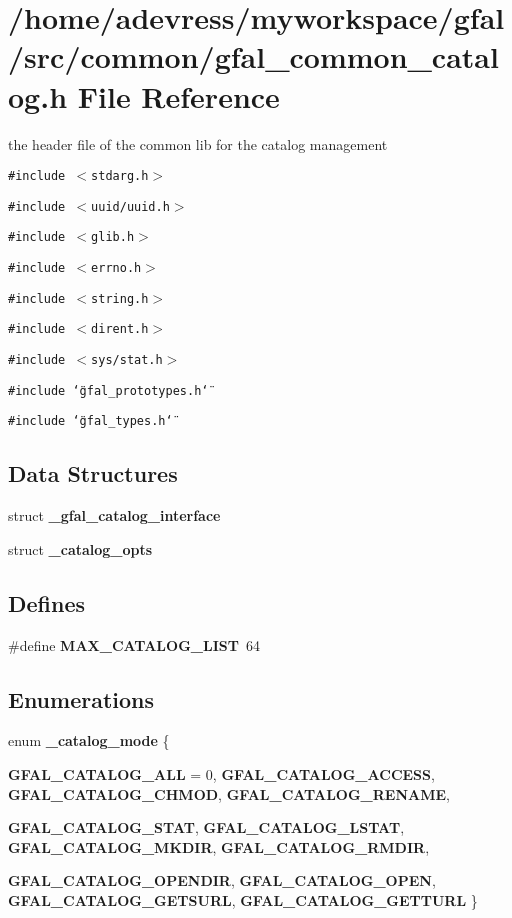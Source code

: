 \section{/home/adevress/myworkspace/gfal/src/common/gfal\_\-common\_\-catalog.h File Reference}
\label{gfal__common__catalog_8h}
the header file of the common lib for the catalog management 

{\tt \#include $<$stdarg.h$>$}\par
{\tt \#include $<$uuid/uuid.h$>$}\par
{\tt \#include $<$glib.h$>$}\par
{\tt \#include $<$errno.h$>$}\par
{\tt \#include $<$string.h$>$}\par
{\tt \#include $<$dirent.h$>$}\par
{\tt \#include $<$sys/stat.h$>$}\par
{\tt \#include \char`\"{}gfal\_\-prototypes.h\char`\"{}}\par
{\tt \#include \char`\"{}gfal\_\-types.h\char`\"{}}\par
\subsection*{Data Structures}
\begin{CompactItemize}
\item 
struct \textbf{\_\-gfal\_\-catalog\_\-interface}
\item 
struct \bf{\_\-catalog\_\-opts}
\end{CompactItemize}
\subsection*{Defines}
\begin{CompactItemize}
\item 
\#define \textbf{MAX\_\-CATALOG\_\-LIST}~64\label{gfal__common__catalog_8h_c39f705683e893b91f559704ee2a707e}

\end{CompactItemize}
\subsection*{Enumerations}
\begin{CompactItemize}
\item 
enum \textbf{\_\-catalog\_\-mode} \{ \par
\textbf{GFAL\_\-CATALOG\_\-ALL} = 0, 
\textbf{GFAL\_\-CATALOG\_\-ACCESS}, 
\textbf{GFAL\_\-CATALOG\_\-CHMOD}, 
\textbf{GFAL\_\-CATALOG\_\-RENAME}, 
\par
\textbf{GFAL\_\-CATALOG\_\-STAT}, 
\textbf{GFAL\_\-CATALOG\_\-LSTAT}, 
\textbf{GFAL\_\-CATALOG\_\-MKDIR}, 
\textbf{GFAL\_\-CATALOG\_\-RMDIR}, 
\par
\textbf{GFAL\_\-CATALOG\_\-OPENDIR}, 
\textbf{GFAL\_\-CATALOG\_\-OPEN}, 
\textbf{GFAL\_\-CATALOG\_\-GETSURL}, 
\textbf{GFAL\_\-CATALOG\_\-GETTURL}
 \}
\end{CompactItemize}
